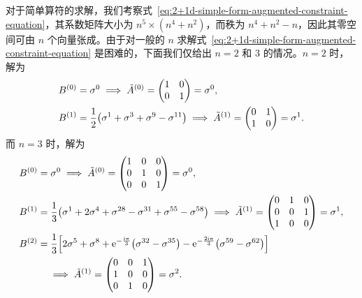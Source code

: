 对于简单算符的求解，我们考察式~\eqref{eq:2+1d-simple-form-augmented-constraint-equation}，其系数矩阵大小为 $n^5\times(n^4+n^2)$，而秩为 $n^4+n^2-n$，因此其零空间可由 $n$ 个向量张成。由于对一般的 $n$ 求解式~\eqref{eq:2+1d-simple-form-augmented-constraint-equation} 是困难的，下面我们仅给出 $n=2$ 和 3 的情况。$n=2$ 时，解为
\begin{align}
  B^{(0)} &= \sigma^0
    \implies \tilde{A}^{(0)} = \begin{pmatrix} 1 & 0 \\ 0 & 1 \end{pmatrix} = \sigma^0, \notag \\
  B^{(1)} &= \frac12 \bigl( \sigma^1 + \sigma^3 + \sigma^9 - \sigma^{11} \bigr)
    \implies \tilde{A}^{(1)} = \begin{pmatrix} 0 & 1 \\ 1 & 0 \end{pmatrix} = \sigma^1.
\end{align}
而 $n=3$ 时，解为
\begin{align}
  B^{(0)} &= \sigma^0
    \implies \tilde{A}^{(0)} = \begin{pmatrix} 1 & 0 & 0 \\ 0 & 1 & 0 \\ 0 & 0 & 1 \end{pmatrix} = \sigma^0, \notag \\
  B^{(1)} &= \frac13 \bigl( \sigma^1 + 2\sigma^4 + \sigma^{28} - \sigma^{31} + \sigma^{55} - \sigma^{58} \bigr)
    \implies \tilde{A}^{(1)} = \begin{pmatrix} 0 & 1 & 0 \\ 0 & 0 & 1 \\ 1 & 0 & 0 \end{pmatrix} = \sigma^1, \notag \\
  B^{(2)} &= \frac13 \Bigl[
      2\sigma^5 + \sigma^8 + \mathrm{e}^{-\frac{\mathrm{i}\pi}{3}} \bigl( \sigma^{32} - \sigma^{35} \bigr)
    - \mathrm{e}^{-\frac{2\mathrm{i}\pi}{3}} \bigl( \sigma^{59} - \sigma^{62} \bigr)
  \Bigr] \notag \\
    &\quad \implies \tilde{A}^{(1)} = \begin{pmatrix} 0 & 0 & 1 \\ 1 & 0 & 0 \\ 0 & 1 & 0 \end{pmatrix} = \sigma^2.
\end{align}

